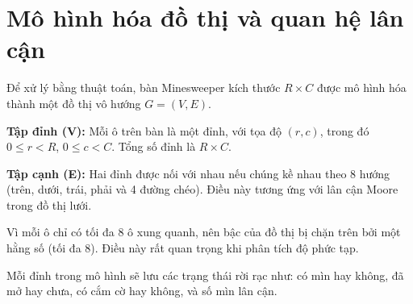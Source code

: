 \section{Mô hình hóa đồ thị và quan hệ lân cận}

Để xử lý bằng thuật toán, bàn Minesweeper kích thước $R \times C$ được mô hình hóa thành một đồ thị vô hướng $G = (V, E)$.

\textbf{Tập đỉnh (V):}  
Mỗi ô trên bàn là một đỉnh, với tọa độ $(r, c)$, trong đó $0 \le r < R$, $0 \le c < C$.  
Tổng số đỉnh là $R \times C$.

\textbf{Tập cạnh (E):}  
Hai đỉnh được nối với nhau nếu chúng kề nhau theo 8 hướng (trên, dưới, trái, phải và 4 đường chéo). Điều này tương ứng với lân cận Moore trong đồ thị lưới.

Vì mỗi ô chỉ có tối đa 8 ô xung quanh, nên bậc của đồ thị bị chặn trên bởi một hằng số (tối đa 8). Điều này rất quan trọng khi phân tích độ phức tạp.

Mỗi đỉnh trong mô hình sẽ lưu các trạng thái rời rạc như: có mìn hay không, đã mở hay chưa, có cắm cờ hay không, và số mìn lân cận.

